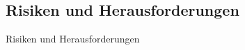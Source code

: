 \subsection{Risiken und Herausforderungen} \label{sec:Risiken und Herausforderungen}
Risiken und Herausforderungen
